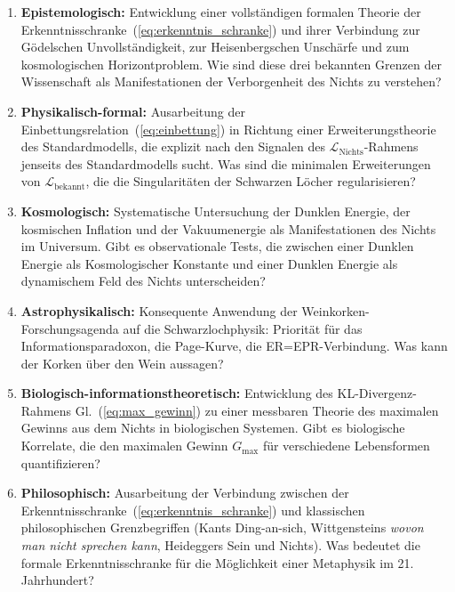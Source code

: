 ﻿\documentclass[12pt,a4paper]{report}
\begin{document}
\begin{enumerate}
	\item \textbf{Epistemologisch:} Entwicklung einer vollständigen formalen Theorie der Erkenntnisschranke~(\ref{eq:erkenntnis_schranke}) und ihrer Verbindung zur Gödelschen Unvollständigkeit, zur Heisenbergschen Unschärfe und zum kosmologischen Horizontproblem. Wie sind diese drei bekannten Grenzen der Wissenschaft als Manifestationen der Verborgenheit des Nichts zu verstehen?

	\item \textbf{Physikalisch-formal:} Ausarbeitung der Einbettungsrelation~(\ref{eq:einbettung}) in Richtung einer Erweiterungstheorie des Standardmodells, die explizit nach den Signalen des $\mathcal{L}_{\text{Nichts}}$-Rahmens jenseits des Standardmodells sucht. Was sind die minimalen Erweiterungen von $\mathcal{L}_{\text{bekannt}}$, die die Singularitäten der Schwarzen Löcher regularisieren?

	\item \textbf{Kosmologisch:} Systematische Untersuchung der Dunklen Energie, der kosmischen Inflation und der Vakuumenergie als Manifestationen des Nichts im Universum. Gibt es observationale Tests, die zwischen einer Dunklen Energie als Kosmologischer Konstante und einer Dunklen Energie als dynamischem Feld des Nichts unterscheiden?

	\item \textbf{Astrophysikalisch:} Konsequente Anwendung der Weinkorken-Forschungsagenda auf die Schwarzlochphysik: Priorität für das Informationsparadoxon, die Page-Kurve, die ER=EPR-Verbindung. Was kann der Korken über den Wein aussagen?

	\item \textbf{Biologisch-informationstheoretisch:} Entwicklung des KL-Divergenz-Rahmens Gl.~(\ref{eq:max_gewinn}) zu einer messbaren Theorie des \glqq maximalen Gewinns aus dem Nichts\grqq{} in biologischen Systemen. Gibt es biologische Korrelate, die den maximalen Gewinn $G_{\max}$ für verschiedene Lebensformen quantifizieren?

	\item \textbf{Philosophisch:} Ausarbeitung der Verbindung zwischen der Erkenntnisschranke~(\ref{eq:erkenntnis_schranke}) und klassischen philosophischen Grenzbegriffen (Kants Ding-an-sich, Wittgensteins \textit{wovon man nicht sprechen kann}, Heideggers Sein und Nichts). Was bedeutet die formale Erkenntnisschranke für die Möglichkeit einer Metaphysik im 21. Jahrhundert?
\end{enumerate}
\end{document}
